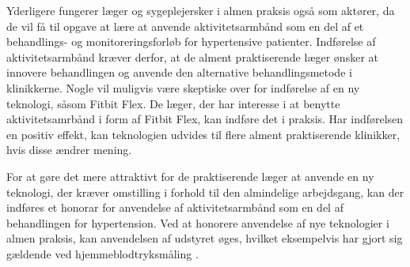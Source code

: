 Yderligere fungerer læger og sygeplejersker i almen praksis også som aktører, da de vil få til opgave at lære at anvende aktivitetsarmbånd som en del af et behandlings- og monitoreringsforløb for hypertensive patienter. 
Indførelse af aktivitetsarmbånd kræver derfor, at de alment praktiserende læger ønsker at innovere behandlingen og anvende den alternative behandlingsmetode i klinikkerne. Nogle vil muligvis være skeptiske over for indførelse af en ny teknologi, såsom Fitbit Flex. De læger, der har interesse i at benytte aktivitetsamrbånd i form af Fitbit Flex, kan indføre det i praksis. Har indførelsen en positiv effekt, kan teknologien udvides til flere alment praktiserende klinikker, hvis disse ændrer mening.

For at gøre det mere attraktivt for de praktiserende læger at anvende en ny teknologi, der kræver omstilling i forhold til den almindelige arbejdsgang, kan der indføres et honorar for anvendelse af aktivitetsarmbånd som en del af behandlingen for hypertension. Ved at honorere anvendelse af nye teknologier i almen praksis, kan anvendelsen af udstyret øges, hvilket eksempelvis har gjort sig gældende ved hjemmeblodtryksmåling \citep{bang2006}.